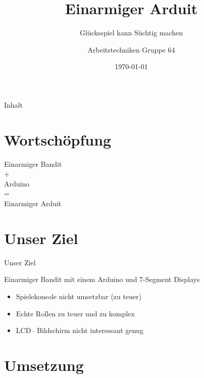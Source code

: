 \documentclass[mathserif,9pt]{beamer}
\title[Einarmiger Arduit]{Einarmiger Arduit}
\subtitle{Glücksspiel kann Süchtig machen}
\author{Arbeitstechniken Gruppe 64}
\institute{Franziska Massmann \; Jonas Nikolić \; Lukas Pensler \; Simon Struck}
\date{\today}
\begin{document}
    \titleframe        %

    \begin{frame}{Inhalt}
        \tableofcontents
    \end{frame}

    \section{Wortschöpfung}
    \begin{frame}{}
        \begin{block}{}
            \centering
            \Huge{
            Einarmiger Bandit \\
            + \\
            Arduino \\
            = \\
            Einarmiger Arduit}
        \end{block}
    \end{frame}

    \section{Unser Ziel}
    \begin{frame}{Unser Ziel}
        \begin{block}{Einarmiger Bandit mit einem Arduino und 7-Segment Displays}
            \begin{itemize}
                \item Spielekonsole nicht umsetzbar (zu teuer)
                \item Echte Rollen zu teuer und zu komplex
                \item LCD\,--\,Bildschirm nicht interessant genug
            \end{itemize}
        \end{block}
    \end{frame}

    \section{Umsetzung}
\end{document}
